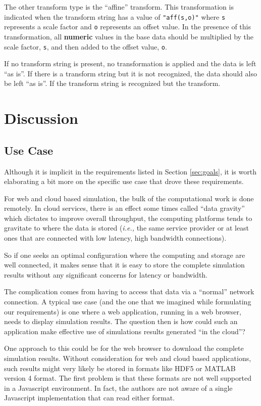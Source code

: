 \documentclass[11pt,a4paper,twocolumn]{article}
\newcommand{\code}[1]{\texttt{#1}} %
\begin{document}
The other transform type is the ``affine'' transform.  This
transformation is indicated when the transform string has a value of
\code{"aff(s,o)"} where \code{s} represents a scale factor and
\code{o} represents an offset value.  In the presence of this
transformation, all \textbf{numeric} values in the base data should be
multiplied by the scale factor, \code{s}, and then added to the offset
value, \code{o}.

If no transform string is present, no transformation is applied and
the data is left ``as is''.  If there is a transform string but it is
not recognized, the data should also be left ``as is''.  If the
transform string is recognized but the transform.

\section{Discussion}
\label{sec:discussion}

\subsection{Use Case}

Although it is implicit in the requirements listed in Section
\ref{sec:goals}, it is worth elaborating a bit more on the specific
use case that drove these requirements.

For web and cloud based simulation, the bulk of the computational work
is done remotely.  In cloud services, there is an effect some times
called ``data gravity'' which dictates to improve overall throughput,
the computing platforms tends to gravitate to where the data is stored
(\textit{i.e.,} the same service provider or at least ones that are connected
with low latency, high bandwidth connections).

So if one seeks an optimal configuration where the computing and
storage are well connected, it makes sense that it is easy to store
the complete simulation results without any significant concerns for
latency or bandwidth.

The complication comes from having to access that data via a
``normal'' network connection.  A typical use case (and the one that
we imagined while formulating our requirements) is one where a web
application, running in a web browser, needs to display simulation
results.  The question then is how could such an application make
effective use of simulations results generated ``in the cloud''?

One approach to this could be for the web browser to download the
complete simulation results.  Without consideration for web and cloud
based applications, such results might very likely be stored in
formats like HDF5 or MATLAB version 4 format.  The first problem is
that these formats are not well supported in a Javascript environment.
In fact, the authors are not aware of a single Javascript
implementation that can read either format.
\end{document}
